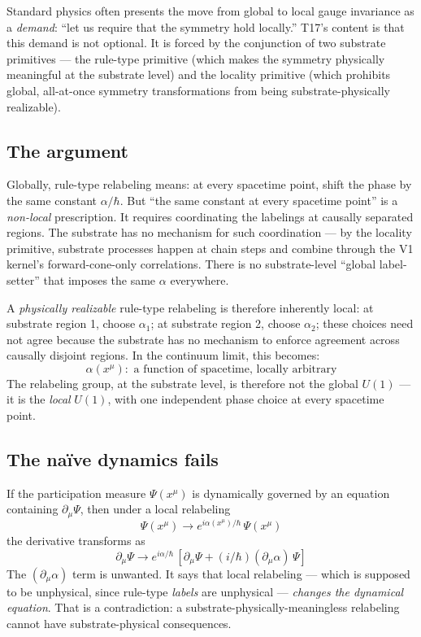 \documentclass[11pt,a4paper]{article}
\begin{document}
Standard physics often presents the move from global to local gauge invariance as a \emph{demand}: ``let us require that the symmetry hold locally.'' T17's content is that this demand is not optional. It is forced by the conjunction of two substrate primitives --- the rule-type primitive (which makes the symmetry physically meaningful at the substrate level) and the locality primitive (which prohibits global, all-at-once symmetry transformations from being substrate-physically realizable).

\subsection{The argument}

Globally, rule-type relabeling means: at every spacetime point, shift the phase by the same constant $\alpha/\hbar$. But ``the same constant at every spacetime point'' is a \emph{non-local} prescription. It requires coordinating the labelings at causally separated regions. The substrate has no mechanism for such coordination --- by the locality primitive, substrate processes happen at chain steps and combine through the V1 kernel's forward-cone-only correlations. There is no substrate-level ``global label-setter'' that imposes the same $\alpha$ everywhere.

A \emph{physically realizable} rule-type relabeling is therefore inherently local: at substrate region 1, choose $\alpha_1$; at substrate region 2, choose $\alpha_2$; these choices need not agree because the substrate has no mechanism to enforce agreement across causally disjoint regions. In the continuum limit, this becomes:
\[
\alpha(x^\mu): \text{ a function of spacetime, locally arbitrary}
\]
The relabeling group, at the substrate level, is therefore not the global $U(1)$ --- it is the \emph{local} $U(1)$, with one independent phase choice at every spacetime point.

\subsection{The na\"ive dynamics fails}

If the participation measure $\Psi(x^\mu)$ is dynamically governed by an equation containing $\partial_\mu \Psi$, then under a local relabeling
\[
\Psi(x^\mu) \to e^{i\alpha(x^\mu)/\hbar}\, \Psi(x^\mu)
\]
the derivative transforms as
\[
\partial_\mu \Psi \to e^{i\alpha/\hbar}\, [\partial_\mu \Psi + (i/\hbar)(\partial_\mu \alpha)\, \Psi]
\]
The $(\partial_\mu \alpha)$ term is unwanted. It says that local relabeling --- which is supposed to be unphysical, since rule-type \emph{labels} are unphysical --- \emph{changes the dynamical equation}. That is a contradiction: a substrate-physically-meaningless relabeling cannot have substrate-physical consequences.
\end{document}
